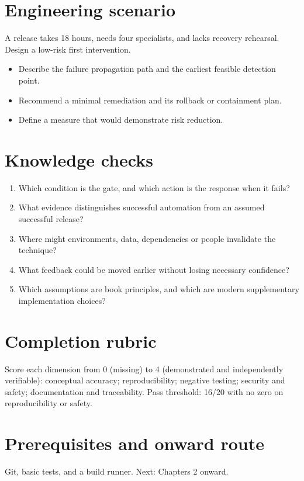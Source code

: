\documentclass[10pt,letterpaper]{article}
\begin{document}
\section{Engineering scenario}
A release takes 18 hours, needs four specialists, and lacks recovery rehearsal. Design a low-risk first intervention.

\begin{itemize}
\item Describe the failure propagation path and the earliest feasible detection point.
\item Recommend a minimal remediation and its rollback or containment plan.
\item Define a measure that would demonstrate risk reduction.
\end{itemize}

\section{Knowledge checks}
\begin{enumerate}
\item Which condition is the gate, and which action is the response when it fails?
\item What evidence distinguishes successful automation from an assumed successful release?
\item Where might environments, data, dependencies or people invalidate the technique?
\item What feedback could be moved earlier without losing necessary confidence?
\item Which assumptions are book principles, and which are modern supplementary implementation choices?
\end{enumerate}

\section{Completion rubric}
Score each dimension from 0 (missing) to 4 (demonstrated and independently verifiable): conceptual accuracy; reproducibility; negative testing; security and safety; documentation and traceability. Pass threshold: 16/20 with no zero on reproducibility or safety.


\section{Prerequisites and onward route}
Git, basic tests, and a build runner. Next: Chapters 2 onward.
\end{document}
